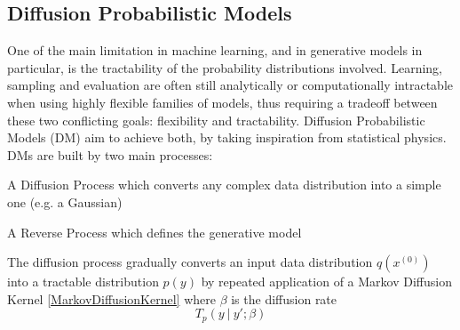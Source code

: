 \documentclass[conference]{IEEEtran}
\begin{document}
\subsection{Diffusion Probabilistic Models}
One of the main limitation in machine learning, and in generative models in particular, is the tractability of the probability distributions involved. Learning, sampling and evaluation are often still analytically or computationally intractable when using highly flexible families of models, thus requiring a tradeoff between these two conflicting goals: flexibility and tractability. Diffusion Probabilistic Models (DM) \cite{diffusionmodels} aim to achieve both, by taking inspiration from statistical physics.\\
DMs are built by two main processes:
\begin{list}{-}{}
	\item A Diffusion Process which converts any complex data distribution into a simple one (e.g. a Gaussian)
	\item A Reverse Process which defines the generative model
\end{list}
The diffusion process gradually converts an input data distribution $q(x^{(0)})$ into a tractable distribution $p(y)$ by repeated application of a Markov Diffusion Kernel \eqref{MarkovDiffusionKernel} where $\beta$ is the diffusion rate
\begin{equation}
T_p(y\:|\:y';\beta)
\label{MarkovDiffusionKernel}
\end{equation}
\end{document}
